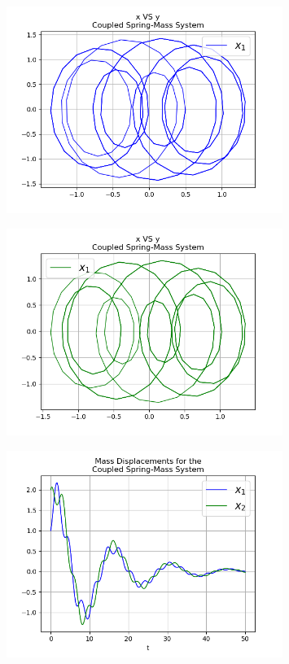 \documentclass{article}
\begin{document}
\begin{figure}[!ht]
\centering
\includegraphics[width=0.8\textwidth]{two_springs3-3}
\end{figure}
\begin{figure}[!ht]
\centering
\includegraphics[width=0.8\textwidth]{two_springs3-4}
\end{figure}
\begin{figure}[!ht]
\centering
\includegraphics[width=0.8\textwidth]{two_springs4-1}
\end{figure}
\end{document}
